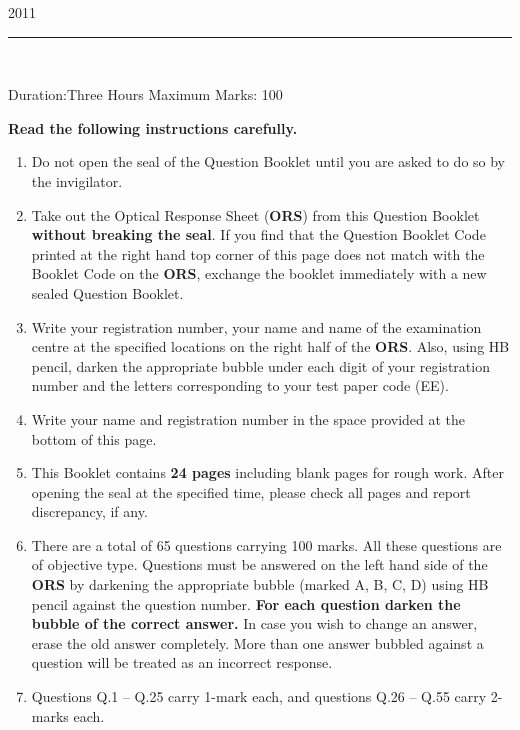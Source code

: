\documentclass[a4paper,10pt]{exam}
\theoremstyle{remark}
\begin{document}
\raggedright{2011}
\hfill
{}\\

\noindent\rule{\textwidth}{0.4pt}

\\
\vspace{0.5cm}
\raggedright{Duration:Three Hours} \hfill Maximum Marks: 100\\
\raggedright{\textbf{Read the following instructions carefully.}}
\vspace{0.1cm}

\begin{enumerate}[leftmargin=0.5cm,label=\arabic*.]
\item Do not open the seal of the Question Booklet until you are asked to do so by the invigilator.
\item Take out the Optical Response Sheet (\textbf{ORS}) from this Question Booklet \textbf{without breaking the seal}.
If you find that the Question Booklet Code printed at the right hand top corner of this page does not match with the Booklet Code on the \textbf{ORS}, exchange the booklet immediately with a new sealed Question Booklet.
\item Write your registration number, your name and name of the examination centre at the specified locations on the right half of the \textbf{ORS}. Also, using HB pencil, darken the appropriate bubble under each digit of your registration number and the letters corresponding to your test paper code (EE).
\item Write your name and registration number in the space provided at the bottom of this page.
\item This Booklet contains \textbf{24 pages} including blank pages for rough work. After opening the seal at the specified time, please check all pages and report discrepancy, if any.
\item There are a total of 65 questions carrying 100 marks. All these questions are of objective type. Questions must be answered on the left hand side of the \textbf{ORS} by darkening the appropriate bubble (marked A, B, C, D) using HB pencil against the question number. \textbf{For each question darken the bubble of the correct answer.} In case you wish to change an answer, erase the old answer completely. More than one answer bubbled against a question will be treated as an incorrect response.
\item Questions Q.1 -- Q.25 carry 1-mark each, and questions Q.26 -- Q.55 carry 2-marks each.

\end{enumerate}
\end{document}
